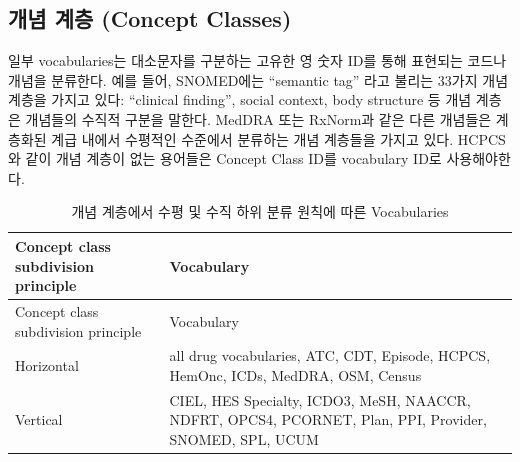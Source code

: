 \documentclass[11pt]{book}
\theoremstyle{definition}
\theoremstyle{definition}
\theoremstyle{definition}
\theoremstyle{remark}
\begin{document}
\subsection{개념 계층 (Concept Classes)}\label{--concept-classes}

일부 vocabularies는 대소문자를 구분하는 고유한 영 숫자 ID를 통해
표현되는 코드나 개념을 분류한다. 예를 들어, SNOMED에는 ``semantic tag''
라고 불리는 33가지 개념 계층을 가지고 있다: ``clinical finding'', social
context, body structure 등 개념 계층은 개념들의 수직적 구분을 말한다.
MedDRA 또는 RxNorm과 같은 다른 개념들은 계층화된 계급 내에서 수평적인
수준에서 분류하는 개념 계층들을 가지고 있다. HCPCS와 같이 개념 계층이
없는 용어들은 Concept Class ID를 vocabulary ID로 사용해야한다.

\begin{longtable}[]{@{}ll@{}}
\caption{\label{tab:sublassification}개념 계층에서 수평 및 수직 하위 분류
원칙에 따른 Vocabularies}\tabularnewline
\toprule
\begin{minipage}[b]{0.13\columnwidth}\raggedright\strut
Concept class subdivision principle\strut
\end{minipage} & \begin{minipage}[b]{0.47\columnwidth}\raggedright\strut
Vocabulary\strut
\end{minipage}\tabularnewline
\midrule
\endfirsthead
\toprule
\begin{minipage}[b]{0.13\columnwidth}\raggedright\strut
Concept class subdivision principle\strut
\end{minipage} & \begin{minipage}[b]{0.47\columnwidth}\raggedright\strut
Vocabulary\strut
\end{minipage}\tabularnewline
\midrule
\endhead
\begin{minipage}[t]{0.13\columnwidth}\raggedright\strut
Horizontal\strut
\end{minipage} & \begin{minipage}[t]{0.47\columnwidth}\raggedright\strut
all drug vocabularies, ATC, CDТ, Episode, HCPCS, HemOnc, ICDs, MedDRA,
OSM, Census\strut
\end{minipage}\tabularnewline
\begin{minipage}[t]{0.13\columnwidth}\raggedright\strut
Vertical\strut
\end{minipage} & \begin{minipage}[t]{0.47\columnwidth}\raggedright\strut
CIEL, HES Specialty, ICDO3, MeSH, NAACCR, NDFRT, OPCS4, PCORNET, Plan,
PPI, Provider, SNOMED, SPL, UCUM\strut

\end{minipage}
\end{longtable}
\end{document}
